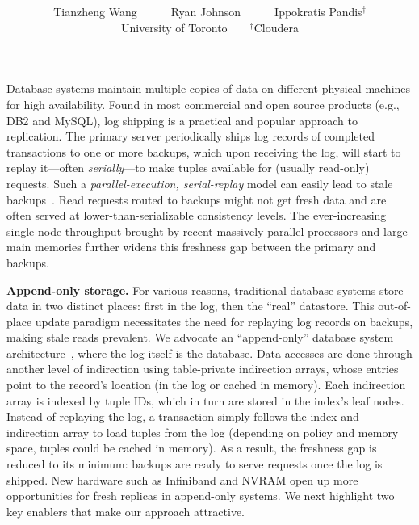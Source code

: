 \documentclass[10pt]{article}
\title{\bf \thepapertitle}
\date{}
\begin{document}
\author{Tianzheng Wang~~~~~~Ryan Johnson~~~~~~Ippokratis Pandis$^\dagger$\\{\sf University of Toronto~~~~$^\dagger$Cloudera}\vspace{-3mm}}
\maketitle
\thispagestyle{empty}

Database systems maintain multiple copies of data on different physical machines for high availability. Found in most commercial and open source products (e.g., DB2 and MySQL), log shipping is a practical and popular approach to replication. The primary server periodically ships log records of completed transactions to one or more backups, which upon receiving the log, will start to replay it---often \textit{serially}---to make tuples available for (usually read-only) requests. Such a \textit{parallel-execution, serial-replay} model can easily lead to stale backups~\cite{KuaFu}. Read requests routed to backups might not get fresh data and are often served at lower-than-serializable consistency levels. The ever-increasing single-node throughput brought by recent massively parallel processors and large main memories further widens this freshness gap between the primary and backups.

\textbf{Append-only storage.} For various reasons, traditional database systems store data in two distinct places: first in the log, then the ``real'' datastore. This out-of-place update paradigm necessitates the need for replaying log records on backups, making stale reads prevalent. We advocate an ``append-only'' database system architecture~\cite{ERMIA}, where the log itself is the database. Data accesses are done through another level of indirection using table-private indirection arrays, whose entries point to the record's location (in the log or cached in memory). Each indirection array is indexed by tuple IDs, which in turn are stored in the index's leaf nodes. Instead of replaying the log, a transaction simply follows the index and indirection array to load tuples from the log (depending on policy and memory space, tuples could be cached in memory). As a result, the freshness gap is reduced to its minimum: backups are ready to serve requests once the log is shipped. New hardware such as Infiniband and NVRAM open up more opportunities for fresh replicas in append-only systems. We next highlight two key enablers that make our approach attractive.
\end{document}

